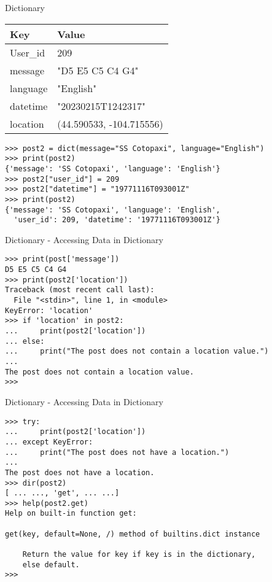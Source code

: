 \documentclass{beamer}
\begin{document}
\begin{frame}[fragile]{Dictionary}

\begin{center}
\begin{tabular}{ |l|l| }
  \hline
  \textbf{Key} & \textbf{Value} \\
  \hline
  User\_id     & 209 \\
  \hline
  message      & "D5 E5 C5 C4 G4" \\
  \hline
  language     & "English" \\
  \hline
  datetime     & "20230215T1242317" \\
  \hline
  location     & (44.590533, -104.715556) \\
  \hline
\end{tabular}
\end{center}

\begin{verbatim}
>>> post2 = dict(message="SS Cotopaxi", language="English")
>>> print(post2)
{'message': 'SS Cotopaxi', 'language': 'English'}
>>> post2["user_id"] = 209
>>> post2["datetime"] = "19771116T093001Z"
>>> print(post2)
{'message': 'SS Cotopaxi', 'language': 'English', 
  'user_id': 209, 'datetime': '19771116T093001Z'}
\end{verbatim}

\end{frame}

\begin{frame}[fragile]{Dictionary - Accessing Data in Dictionary}
\begin{verbatim}
>>> print(post['message'])
D5 E5 C5 C4 G4
>>> print(post2['location'])
Traceback (most recent call last):
  File "<stdin>", line 1, in <module>
KeyError: 'location'
>>> if 'location' in post2:
...     print(post2['location'])
... else:
...     print("The post does not contain a location value.")
...
The post does not contain a location value.
>>> 
\end{verbatim}
\end{frame}

\begin{frame}[fragile]{Dictionary - Accessing Data in Dictionary}
\begin{verbatim}
>>> try:
...     print(post2['location'])
... except KeyError:
...     print("The post does not have a location.")
...
The post does not have a location.
>>> dir(post2)
[ ... ..., 'get', ... ...]
>>> help(post2.get)
Help on built-in function get:

get(key, default=None, /) method of builtins.dict instance

    Return the value for key if key is in the dictionary, 
    else default.
>>> 
\end{verbatim}
\end{frame}
\end{document}
